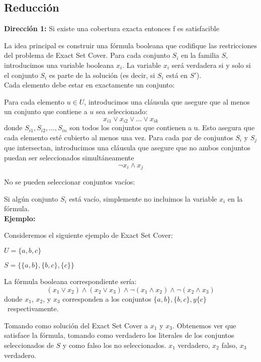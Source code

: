 \documentclass{article}
\begin{document}
\subsection{Reducción}

\textbf{Dirección 1:} Si existe una cobertura exacta  entonces f es satisfacible

La idea principal es construir una fórmula booleana que codifique las restricciones del problema de Exact Set Cover. Para cada conjunto \(S_i\) en la familia \(S\), introducimos una variable booleana \(x_i\). La variable \(x_i\) será verdadera si y solo si el conjunto \(S_i\) es parte de la solución (es decir, si \(S_i\) está en \(S'\)).\\

Cada elemento debe estar en exactamente un conjunto:

Para cada elemento \(u \in U\), introducimos una cláusula que asegure que al menos un conjunto que contiene a \(u\) sea seleccionado:
\[ x_{i1} \vee x_{i2} \vee \dots \vee x_{ik}\]
donde \(S_{i1}, S_{i2}, \dots, S_{in}\) son todos los conjuntos que contienen a u. Esto asegura que cada elemento esté cubierto al menos una vez.
Para cada par de conjuntos $S_i$ y $S_j$ que intersectan, introducimos una cláusula que asegure que no ambos conjuntos puedan ser seleccionados simultáneamente
\[\neg x_i \wedge x_j\]

No se pueden seleccionar conjuntos vacíos:

Si algún conjunto $S_i$ está vacío, simplemente no incluimos la variable $x_i$ en la fórmula. \\

\textbf{Ejemplo:}

Consideremos el siguiente ejemplo de Exact Set Cover:

\(U = \{a, b, c\}\)

\(S = \{\{a, b\}, \{b, c\}, \{c\}\}\)

La fórmula booleana correspondiente sería:
\[ (x_{1} \vee x_{2}) \wedge (x_{2} \vee x_{3}) \wedge \neg(x_{1} \wedge x_{2}) \wedge \neg(x_{2} \wedge x_{3})\]
donde $x_1$, $x_2$, y $x_3$ corresponden a los conjuntos \(\{a, b\}, \{b, c\}, y \{c\}\)\ respectivamente.

Tomando como solución del Exact Set Cover a $x_1$ y $x_3$.
Obtenemos ver que satisface la fórmula, tomando como verdadero los literales de los conjuntos seleccionados de $S$ y como falso los no seleccionados.
$x_1$ verdadero, $x_2$ falso, $x_3$ verdadero. \\
\end{document}
